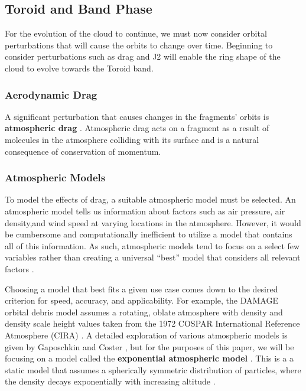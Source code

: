 \documentclass[a4paper, 12pt]{article}
\newcommand{\lindex}[1]{%
	\lowercase{\def\temp{#1}}%
	\expandafter\index\expandafter{\temp}%
}
\newcommand{\boldindex}[1]{%
	\textbf{#1}\lindex{#1}%
}
\begin{document}
\subsection{Toroid and Band Phase}
For the evolution of the cloud to continue, we must now consider orbital perturbations that will cause the orbits to change over time. Beginning to consider perturbations such as drag and J2 will enable the ring shape of the cloud to evolve towards the Toroid band. 

\subsubsection{Aerodynamic Drag}

A significant perturbation that causes changes in the fragments' orbits is \boldindex{atmospheric drag}. Atmospheric drag acts on a fragment as a result of molecules in the atmosphere colliding with its surface and is a natural consequence of conservation of momentum. 

\subsubsection{Atmospheric Models}

To model the effects of drag, a suitable atmospheric model must be selected. An atmospheric model tells us information about factors such as air pressure, air density,and wind speed at varying locations in the atmosphere. However, it would be cumbersome and computationally inefficient to utilize a model that contains all of this information.  As such, atmospheric models tend to focus on a select few variables rather than creating a universal ``best'' model that considers all relevant factors \citep{vallado_d._2013}.

Choosing a model that best fits a given use case comes down to the desired criterion for speed, accuracy, and applicability. For example, the DAMAGE orbital debris model assumes a rotating, oblate atmosphere with density and density scale height values taken from the 1972 COSPAR International Reference Atmosphere (CIRA) \citep{soton388786}.  A detailed exploration of various atmospheric models is given by Gaposchkin and Coster \citep{Gaposchkin1988AnalysisOS}, but for the purposes of this paper, we will be focusing on a model called the \boldindex{exponential atmospheric model}. This is a  a static model that assumes a spherically symmetric distribution of particles, where the density decays exponentially with increasing altitude \citep{vallado_d._2013}.
\end{document}

